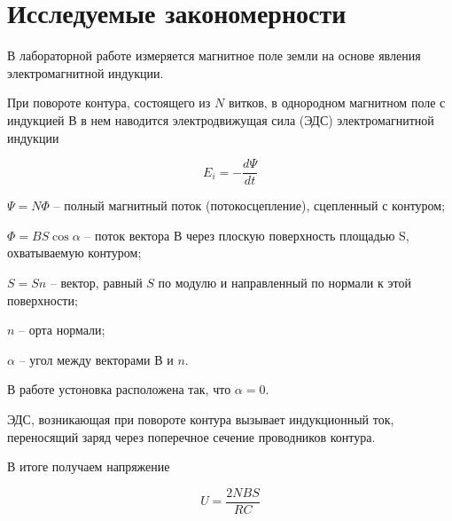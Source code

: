 \section*{Исследуемые закономерности}

В лабораторной работе измеряется магнитное поле земли 
на основе явления электромагнитной индукции.

При повороте контура, состоящего из $ N $ витков, в однородном магнитном поле с
индукцией $ В $ в нем наводится электродвижущая сила (ЭДС) электромагнитной индукции 

\begin{equation}
	E_i = -\dfrac{d\Psi}{dt}
\end{equation}

$ \Psi = N\Phi $ -- полный магнитный поток (потокосцепление), сцепленный с контуром;

$ \Phi = BS\cos{\alpha} $ -- поток вектора В через плоскую поверхность площадью S,
охватываемую контуром;

$ S = Sn $ -- вектор, равный $ S $ по модулю и направленный по
нормали к этой поверхности;

$ n $ -- орта нормали;

$ \alpha $ -- угол между векторами $ В $ и $ n $.
 
В работе устоновка расположена так, что $ \alpha = 0 $.

ЭДС, возникающая при повороте контура вызывает индукционный ток, переносящий заряд 
через поперечное сечение проводников контура.

В итоге получаем напряжение

\begin{equation}\label{key}
	U = \dfrac{2NBS}{RC}
\end{equation}